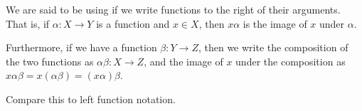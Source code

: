 \documentclass[12pt]{article}
\begin{document}
We are said to be using {}
if we write functions to the right of their arguments.
That is, if $\alpha : X \to Y$ is a function and $x \in X$,
then $x \alpha$ is the image of $x$ under $\alpha$.

Furthermore, if we have a function $\beta : Y \to Z$,
then we write the composition of the two functions
as $\alpha \beta : X \to Z$,
and the image of $x$ under the composition
as $x \alpha \beta = x (\alpha \beta) = (x \alpha) \beta$.

Compare this to left function notation.
\end{document}
